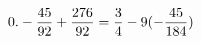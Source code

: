 \documentclass[preview]{standalone}
\begin{document}
\begin{align*}
\special{dvisvgm:raw <g id='unique000'>}0.- \frac{45}{92} + \frac{276}{92} = \frac{3}{4} - 9(- \frac{45}{184})\special{dvisvgm:raw </g>}
\end{align*}
\end{document}
